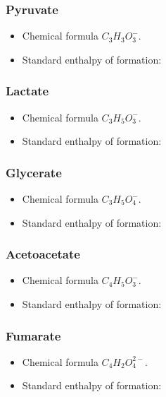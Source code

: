 \documentclass{article}
\begin{document}
\subsubsection{Pyruvate}
\begin{itemize}
    \item Chemical formula $C_3H_3O_3^-$.
    \item Standard enthalpy of formation:
\end{itemize}

\subsubsection{Lactate}
\begin{itemize}
    \item Chemical formula $C_3H_5O_3^-$.
    \item Standard enthalpy of formation:
\end{itemize}

\subsubsection{Glycerate}
\begin{itemize}
    \item Chemical formula $C_3H_5O_4^-$.
    \item Standard enthalpy of formation:
\end{itemize}

\subsubsection{Acetoacetate}
\begin{itemize}
    \item Chemical formula $C_4H_5O_3^-$.
    \item Standard enthalpy of formation:
\end{itemize}

\subsubsection{Fumarate}
\begin{itemize}
    \item Chemical formula $C_4H_2O_4^{2-}$.
    \item Standard enthalpy of formation:
\end{itemize}
\end{document}
